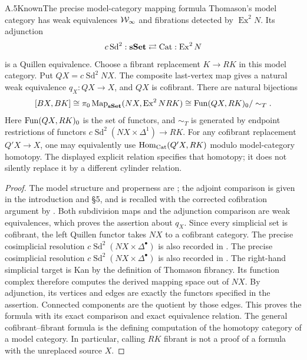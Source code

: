 \begin{claim}{A.5}{Known}{The precise model-category mapping formula}
Thomason's model category has weak equivalences $\mathcal W_\infty$ and fibrations detected by $\operatorname{Ex}^2N$. Its adjunction
\[
 c\operatorname{Sd}^2:\mathbf{sSet}\rightleftarrows\mathrm{Cat}:
 \operatorname{Ex}^2N
\]
is a Quillen equivalence. Choose a fibrant replacement $K\to RK$ in this model category. Put $QX=c\operatorname{Sd}^2NX$. The composite last-vertex map gives a natural weak equivalence $q_X:QX\to X$, and $QX$ is cofibrant. There are natural bijections
\[
 [BX,BK]\cong\pi_0\operatorname{Map}_{\mathbf{sSet}}(NX,\operatorname{Ex}^2NRK)
 \cong\operatorname{Fun}(QX,RK)_0/\sim_T .
\]
Here $\operatorname{Fun}(QX,RK)_0$ is the set of functors, and $\sim_T$ is generated by endpoint restrictions of functors
$c\operatorname{Sd}^2(NX\times\Delta^1)\to RK$.
For any cofibrant replacement $Q'X\to X$, one may equivalently use $\operatorname{Hom}_{\mathrm{Cat}}(Q'X,RK)$ modulo model-category homotopy. The displayed explicit relation specifies that homotopy; it does not silently replace it by a different cylinder relation.
\end{claim}
\begin{proof}
The model structure and properness are \citet[Theorem~4.9 and Corollary~5.5]{Thomason1980}; the adjoint comparison is given in the introduction and \S5, and is recalled with the corrected cofibration argument by \citet[\S2]{Raptis2010}. Both subdivision maps and the adjunction comparison are weak equivalences, which proves the assertion about $q_X$. Since every simplicial set is cofibrant, the left Quillen functor takes $NX$ to a cofibrant category. The precise cosimplicial resolution $c\operatorname{Sd}^2(NX\times\Delta^\bullet)$ is also recorded in \citet[Remark~4.9]{Raptis2010}. The precise cosimplicial resolution $c\operatorname{Sd}^2(NX\times\Delta^\bullet)$ is also recorded in \citet[Remark~4.9]{Raptis2010}. The right-hand simplicial target is Kan by the definition of Thomason fibrancy. Its function complex therefore computes the derived mapping space out of $NX$. By adjunction, its vertices and edges are exactly the functors specified in the assertion. Connected components are the quotient by those edges. This proves the formula with its exact comparison and exact equivalence relation. The general cofibrant--fibrant formula is the defining computation of the homotopy category of a model category. In particular, calling $RK$ fibrant is not a proof of a formula with the unreplaced source $X$.
\end{proof}

